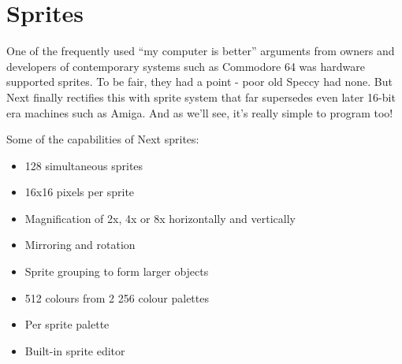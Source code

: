 \section{Sprites}
\label{zx_next_sprites}


One of the frequently used ``my computer is better'' arguments from owners and developers of contemporary systems such as Commodore 64 was hardware supported sprites. To be fair, they had a point - poor old Speccy had none. But Next finally rectifies this with sprite system that far supersedes even later 16-bit era machines such as Amiga. And as we'll see, it's really simple to program too!

Some of the capabilities of Next sprites:

\begin{itemize}[topsep=1pt,itemsep=1pt]
    \item 128 simultaneous sprites
    \item 16x16 pixels per sprite
    \item Magnification of 2x, 4x or 8x horizontally and vertically
    \item Mirroring and rotation
    \item Sprite grouping to form larger objects
    \item 512 colours from 2 256 colour palettes
    \item Per sprite palette
    \item Built-in sprite editor
\end{itemize}

